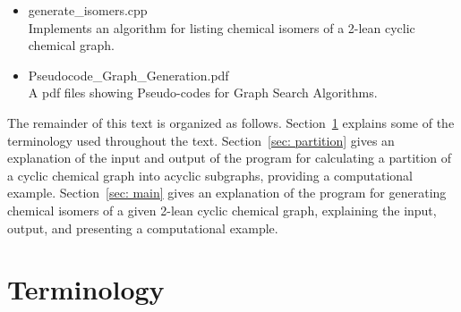 \documentclass[11pt,titlepage,dvipdfmx,twoside]{article}
\begin{document}
\begin{itemize}
\begin{itemize}
\begin{itemize}
			\item{generate\_isomers.cpp}\\
				Implements an algorithm for listing chemical isomers of
				a 2-lean cyclic chemical graph.
			
			\item{Pseudocode\_Graph\_Generation.pdf}\\
			  A pdf files showing Pseudo-codes for Graph Search Algorithms.
		\end{itemize}

	\end{itemize}
\end{itemize}

The remainder of this text is organized as follows.
Section~\ref{sec:term} explains some of the terminology used throughout the text.
Section~\ref{sec: partition} gives an explanation of the input and output of
the program for calculating a partition of a cyclic chemical graph into
acyclic subgraphs, providing a computational example.
Section~\ref{sec: main}
gives an explanation of the program for generating chemical isomers of
a given 2-lean cyclic chemical graph, explaining the input, output, and
presenting a computational example.



\section{Terminology}
\label{sec:term}
\end{document}
